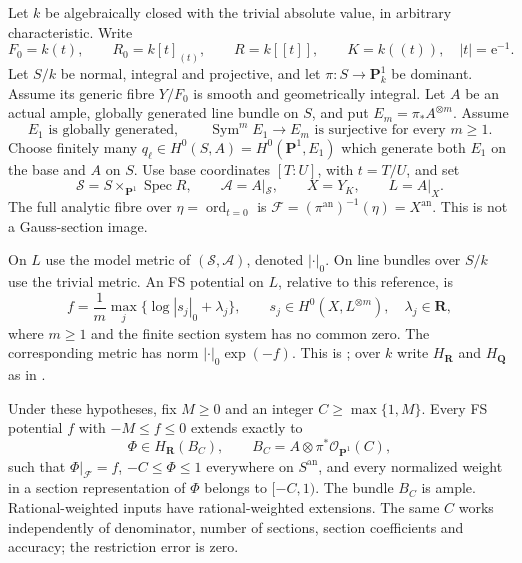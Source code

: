 Let \(k\) be algebraically closed with the trivial absolute value, in
arbitrary characteristic. Write
\[
 F_0=k(t),\qquad R_0=k[t]_{(t)},\qquad R=k[[t]],\qquad
 K=k((t)),\quad |t|=\mathrm e^{-1}.
\]
Let \(S/k\) be normal, integral and projective, and let
\(\pi:S\to\mathbf P^1_k\) be dominant. Assume its generic fibre \(Y/F_0\)
is smooth and geometrically integral. Let \(A\) be an actual ample,
globally generated line bundle on \(S\), and put \(E_m=\pi_*A^{\otimes m}\).
Assume
\begin{equation}\label{eq:p081-curvebase-generation}
 E_1\text{ is globally generated},\qquad
 \operatorname{Sym}^m E_1\longrightarrow E_m
       \text{ is surjective for every }m\geq1.
\end{equation}
Choose finitely many \(q_\ell\in H^0(S,A)=H^0(\mathbf P^1,E_1)\)
which generate both \(E_1\) on the base and \(A\) on \(S\).
Use base coordinates \([T:U]\), with \(t=T/U\), and set
\[
 \mathscr S=S\times_{\mathbf P^1}\operatorname{Spec}R,\qquad
 \mathscr A=A|_{\mathscr S},\qquad
 X=Y_K,\qquad L=A|_X.
\]
The full analytic fibre over \(\eta=\operatorname{ord}_{t=0}\) is
\(\mathcal F=(\pi^{\mathrm{an}})^{-1}(\eta)=X^{\mathrm{an}}\).
This is not a Gauss-section image.

On \(L\) use the model metric of \((\mathscr S,\mathscr A)\), denoted
\(|\cdot|_0\). On line bundles over \(S/k\) use the trivial metric.
An FS potential on \(L\), relative to this reference, is
\begin{equation}\label{eq:p081-curvebase-fs}
 f=\frac1m\max_j\{\log|s_j|_0+\lambda_j\},\qquad
 s_j\in H^0(X,L^{\otimes m}),\quad \lambda_j\in\mathbf R,
\end{equation}
where \(m\geq1\) and the finite section system has no common zero.
The corresponding metric has norm \(|\cdot|_0\exp(-f)\).
This is \cite[Definition~5.2]{BE2021}; over \(k\) write \(H_{\mathbf R}\)
and \(H_{\mathbf Q}\) as in \cite[Definition~2.18]{BJ22}.

\begin{proposition}\label{prop:p081-curvebase-exact-extension}
Under these hypotheses, fix \(M\geq0\) and an integer
\(C\geq\max\{1,M\}\). Every FS potential \(f\) with \(-M\leq f\leq0\)
extends exactly to
\[
 \Phi\in H_{\mathbf R}(B_C),\qquad
 B_C=A\otimes\pi^*\mathcal O_{\mathbf P^1}(C),
\]
such that \(\Phi|_{\mathcal F}=f\), \(-C\leq\Phi\leq1\) everywhere
on \(S^{\mathrm{an}}\), and every normalized weight in a section
representation of \(\Phi\) belongs to \([-C,1)\).
The bundle \(B_C\) is ample. Rational-weighted inputs have
rational-weighted extensions. The same \(C\) works independently of
denominator, number of sections, section coefficients and accuracy;
the restriction error is zero.
\end{proposition}


